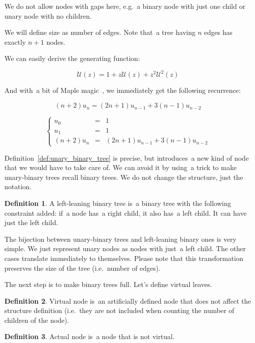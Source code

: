 \documentclass[final]{article}
\theoremstyle{definition}
\newtheorem{definition}{Definition}[subsection]
\theoremstyle{definition}
\theoremstyle{remark}
\newcommand{\gf}[1]{\ensuremath{\mathcal{#1}}}
\begin{document}
We do not allow nodes with gaps here, e.g.~a binary node with just one child or unary node with no children.

We will define size as number of edges. Note that~a tree having \(n\) edges has exactly \(n + 1\) nodes.

We can easily derive the generating function:

\[\gf{U}(z) = 1 + z\gf{U}(z) + z^2 \gf{U}^2(z)\]

And with~a bit of Maple magic~\cite{gfun}, we immediately get the following recurrence:

\[(n + 2)u_{n} = (2n + 1)u_{n - 1} + 3(n - 1)u_{n - 2}\]

\[\left\{\begin{array}{rcl}
            u_0 &=& 1\\
            u_1 &=& 1\\
            (n + 2)u_{n} &=& (2n + 1)u_{n - 1} + 3(n - 1)u_{n - 2}
\end{array}\right.\]

Definition~\ref{def:unary_binary_tree} is precise, but introduces~a new kind of node that we would have to take care of. We can avoid it by using~a trick to make unary-binary trees recall binary trees. We do not change the structure, just the notation.

\begin{definition}
    \label{def:unary_binary_2}
    A left-leaning binary tree is~a binary tree with the following constraint added: if~a node has~a right child, it also has~a left child. It can have just the left child.
\end{definition}

The bijection between unary-binary trees and left-leaning binary ones is very simple. We just represent unary nodes as nodes with just~a left child. The other cases translate immediately to themselves. Please note that this transformation preserves the size of the tree (i.e.~number of edges).

The next step is to make binary trees full. Let's define virtual leaves.

\begin{definition}
    Virtual node is~an artificially defined node that does not affect the structure definition (i.e.~they are not included when counting the number of children of the node).
\end{definition}

\begin{definition}
    Actual node is~a node that is not virtual.
\end{definition}
\end{document}
